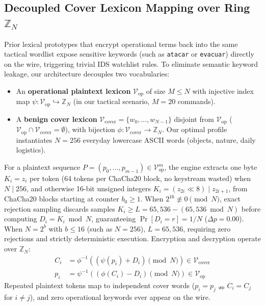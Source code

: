 \documentclass[conference]{IEEEtran}
\begin{document}
\subsection{Decoupled Cover Lexicon Mapping over Ring $\mathbb{Z}_N$}
Prior lexical prototypes that encrypt operational terms back into the same tactical wordlist expose sensitive keywords (such as \texttt{atacar} or \texttt{evacuar}) directly on the wire, triggering trivial IDS watchlist rules. To eliminate semantic keyword leakage, our architecture decouples two vocabularies:
\begin{itemize}
    \item An \textbf{operational plaintext lexicon} $\mathcal{V}_{\text{op}}$ of size $M \le N$ with injective index map $\psi: \mathcal{V}_{\text{op}} \hookrightarrow \mathbb{Z}_N$ (in our tactical scenario, $M=20$ commands).
    \item A \textbf{benign cover lexicon} $\mathcal{V}_{\text{cover}} = \{w_0, \dots, w_{N-1}\}$ disjoint from $\mathcal{V}_{\text{op}}$ ($\mathcal{V}_{\text{op}} \cap \mathcal{V}_{\text{cover}} = \emptyset$), with bijection $\phi: \mathcal{V}_{\text{cover}} \to \mathbb{Z}_N$. Our optimal profile instantiates $N=256$ everyday lowercase ASCII words (objects, nature, daily logistics).
\end{itemize}

For a plaintext sequence $P = (p_0, \dots, p_{m-1}) \in \mathcal{V}_{\text{op}}^m$, the engine extracts one byte $K_i = z_i$ per token (64 tokens per ChaCha20 block, no keystream wasted) when $N \mid 256$, and otherwise 16-bit unsigned integers $K_i = (z_{2i} \ll 8) \mid z_{2i+1}$, from ChaCha20 blocks starting at counter $b_0 \ge 1$. When $2^{16} \not\equiv 0 \pmod N$, exact rejection sampling discards samples $K_i \ge L = 65,536 - (65,536 \bmod N)$ before computing $D_i = K_i \bmod N$, guaranteeing $\Pr[D_i = r] = 1/N$ ($\Delta p = 0.00$). When $N = 2^b$ with $b \le 16$ (such as $N=256$), $L = 65,536$, requiring zero rejections and strictly deterministic execution. Encryption and decryption operate over $\mathbb{Z}_N$:
\begin{align}
C_i &= \phi^{-1}\left( (\psi(p_i) + D_i) \pmod N \right) \in \mathcal{V}_{\text{cover}} \\
p_i &= \psi^{-1}\left( (\phi(C_i) - D_i) \pmod N \right) \in \mathcal{V}_{\text{op}}
\end{align}
Repeated plaintext tokens map to independent cover words ($p_i = p_j \nRightarrow C_i = C_j$ for $i \neq j$), and zero operational keywords ever appear on the wire.
\end{document}
